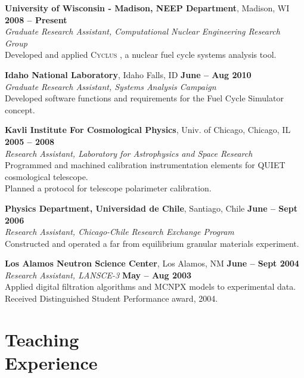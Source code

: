 \documentclass[margin,line]{resume}
\newcommand{\Cyclus}{\textsc{Cyclus }}
\begin{document}
\begin{resume}
    \textbf{University of Wisconsin - Madison, NEEP Department}, Madison, WI \hfill \textbf{2008 -- Present}\\
		\textsl{Graduate Research Assistant, Computational Nuclear Engineering Research Group}\\ 
		Developed and applied \Cyclus, a nuclear fuel cycle systems analysis tool.

    \textbf{Idaho National Laboratory}, Idaho Falls, ID \hfill \textbf{June -- Aug 2010}\\
		\textsl{Graduate Research Assistant, Systems Analysis Campaign}\\ 
		Developed software functions and requirements for the Fuel Cycle Simulator concept.

    \textbf{Kavli Institute For Cosmological Physics}, Univ. of Chicago, Chicago, IL \hfill \textbf{2005 -- 2008}\\
                \textsl{Research Assistant, Laboratory for Astrophysics and Space Research}\\
                Programmed and machined calibration instrumentation elements for QUIET cosmological telescope.\\
                Planned a protocol for telescope polarimeter calibration.

    \textbf{Physics Department, Universidad de Chile}, Santiago, Chile \hfill \textbf{June -- Sept 2006}\\
                \textsl{Research Assistant, Chicago-Chile Research Exchange Program}\\
                 Constructed and operated a far from equilibrium granular materials experiment.

    \textbf{Los Alamos Neutron Science Center}, Los Alamos, NM \hfill \textbf{June -- Sept 2004}\\ 
                \textsl{Research Assistant, LANSCE-3} \hfill \textbf{May -- Aug 2003}\\
                Applied digital filtration algorithms and MCNPX models to experimental data.\\
		Received Distinguished Student Performance award, 2004.
    \pagebreak
    \section{\mysidestyle Teaching\\Experience}


\end{resume}
\end{document}
